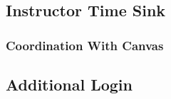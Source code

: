 \documentclass[]{article}
\begin{document}
\subsection{Instructor Time Sink}
\subsubsection{Coordination With Canvas}
\subsection{Additional Login}


%
%
\end{document}

